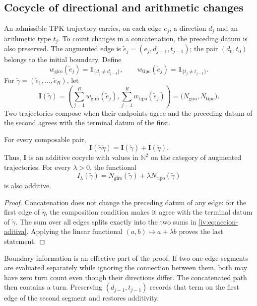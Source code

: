 \subsection{Cocycle of directional and arithmetic changes}

An admissible TPK trajectory carries, on each edge
\(e_j\), a direction \(d_j\) and an arithmetic type
\(t_j\). To count changes in a concatenation,
the preceding datum is also preserved. The augmented edge is
\(\widetilde e_j=(e_j,d_{j-1},t_{j-1})\); the pair
\((d_0,t_0)\) belongs to the initial boundary. Define
\[
 w_{\mathrm{giro}}(\widetilde e_j)
       =\mathbf1_{\{d_j\ne d_{j-1}\}},\qquad
 w_{\mathrm{tipo}}(\widetilde e_j)
       =\mathbf1_{\{t_j\ne t_{j-1}\}}.
\]
For \(\widetilde\gamma=(\widetilde e_1,\ldots,
\widetilde e_R)\), let
\begin{equation}
 \mathbf I(\widetilde\gamma)=
 \left(\sum_{j=1}^R w_{\mathrm{giro}}(\widetilde e_j),
       \sum_{j=1}^R w_{\mathrm{tipo}}(\widetilde e_j)\right)
 =\bigl(N_{\mathrm{giro}},N_{\mathrm{tipo}}\bigr).
 \label{iv:eq:cociclo-accion}
\end{equation}
Two trajectories compose when their endpoints agree
and the preceding datum of the second agrees with the terminal
datum of the first.

\begin{proposition}
\label{iv:prop:accion-aditiva}
For every composable pair,
\begin{equation}
 \mathbf I(\widetilde\gamma\widetilde\eta)
 =\mathbf I(\widetilde\gamma)+\mathbf I(\widetilde\eta).
 \label{iv:eq:accion-aditiva}
\end{equation}
Thus, \(\mathbf I\) is an additive cocycle with values
in \(\mathbb N^2\) on the category of augmented
trajectories. For every \(\lambda>0\), the functional
\[
 I_\lambda(\widetilde\gamma)
 =N_{\mathrm{giro}}(\widetilde\gamma)
      +\lambda N_{\mathrm{tipo}}(\widetilde\gamma)
\]
is also additive.
\end{proposition}
\begin{proof}
Concatenation does not change the preceding datum of any
edge: for the first edge of \(\widetilde\eta\),
the composition condition makes it agree with the terminal datum
of \(\widetilde\gamma\). The sum over all edges
splits exactly into the two sums in
\eqref{iv:eq:accion-aditiva}. Applying the linear functional
\((a,b)\mapsto a+\lambda b\) proves the last statement.
\end{proof}

Boundary information is an effective part of the proof.
If two one-edge segments are evaluated separately
while ignoring the connection between them, both may have zero
turn count even though their directions differ. The
concatenated path then contains a turn. Preserving
\((d_{j-1},t_{j-1})\) records that term on the first
edge of the second segment and restores additivity.

